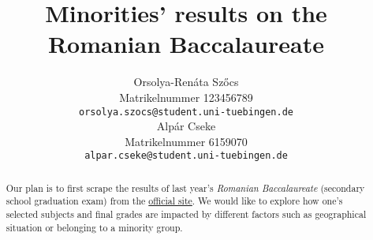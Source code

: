 \documentclass{article}
\title{Minorities' results on the Romanian Baccalaureate}
\author{%
  Orsolya-Renáta Szőcs\\
  Matrikelnummer 123456789\\
  \texttt{orsolya.szocs@student.uni-tuebingen.de} \\
  \And
  Alpár Cseke\\
  Matrikelnummer 6159070\\
  \texttt{alpar.cseke@student.uni-tuebingen.de} \\
}
\begin{document}
\maketitle

\begin{abstract}
  Our plan is to first scrape the results of last year's \emph{Romanian Baccalaureate} (secondary school graduation exam) from the \href{http://static.bacalaureat.edu.ro/2021/rapoarte/rezultate/index.html}{official site}. We would like to explore how one's selected subjects and final grades are impacted by different factors such as geographical situation or belonging to a minority group.
\end{abstract}
\end{document}
